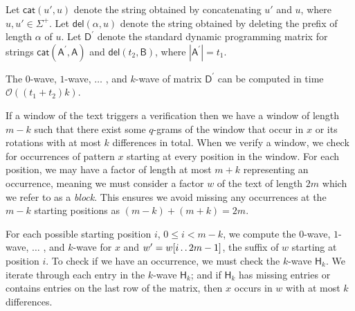 \documentclass[runningheads, envcountsame, a4paper]{llncs}\usepackage{etex}
\def\dd{\mathinner{.\,.}}
\newcommand{\cO}{\mathcal{O}}
\begin{document}
Let $\textsf{cat}(u', u)$ denote the string obtained by 
concatenating $u'$ and $u$, where $u,u' \in \Sigma^+$.
Let $\textsf{del}(\alpha, u)$ denote the string obtained by deleting the 
prefix of length $\alpha$ of $u$.
Let $\textsf{D}^{\prime}$ denote the standard dynamic 
programming matrix for strings $\textsf{cat}(\textsf{A}^{\prime}, \textsf{A})$ and 
$\textsf{del}(t_2,\textsf{B})$, where $|\textsf{A}^{\prime}|=t_1$.

\begin{theorem}
The $0$-wave, $1$-wave, $\ldots$ , and $k$-wave of matrix $\textsf{D}^{\prime}$ can be computed in time $\cO((t_1 
+ t_2)k)$.
\label{the:Hsu}
\end{theorem}

If a window of the text triggers a verification then we have a window of length $m-k$ such that there exist some $q$-grams of the window that occur in $x$ or its rotations with at most $k$ differences in total. When we verify a window, we check for occurrences of pattern $x$ starting at every position in the window. For each position, we may have a factor of length at most $m+k$ representing an occurrence, meaning we must consider a factor $w$ of the text of length $2m$ which we refer to as a \textit{block}. This ensures we avoid missing any occurrences at the $m-k$ starting positions as $(m-k) + (m+k)=2m$.

For each possible starting position $i$, $0 \leq i < m-k$, we compute the $0$-wave, $1$-wave, $\dots$ , and $k$-wave for $x$ 
and $w'=w[i \dd 2m-1]$, the suffix of $w$ starting at position $i$. To check if we have an occurrence, we must check the $k$-wave $\textsf{H}_k$. 
We iterate through each entry in the $k$-wave $\textsf{H}_k$; and if $\textsf{H}_k$ has missing entries or contains entries on the last row of the matrix, then $x$ occurs in $w$ with at most $k$ differences. 
\end{document}
